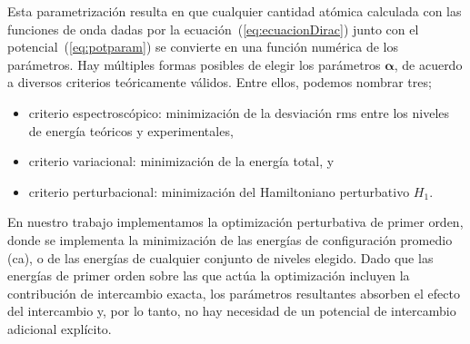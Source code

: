 Esta parametrización resulta en que cualquier cantidad atómica calculada 
con las funciones de onda dadas por la ecuación~(\ref{eq:ecuacionDirac}) 
junto con el potencial~(\ref{eq:potparam}) se convierte en una función 
numérica de los parámetros. Hay múltiples formas posibles de elegir los 
parámetros $\boldsymbol{\alpha}$, de acuerdo a diversos criterios 
teóricamente válidos. Entre ellos, podemos nombrar tres;
\begin{itemize}
\item criterio espectroscópico: minimización de la desviación \acs{rms} 
entre los niveles de energía teóricos y experimentales,
\item criterio variacional: minimización de la energía total, y
\item criterio perturbacional: minimización del Hamiltoniano perturbativo
$H_1$. %
\end{itemize}
En nuestro trabajo implementamos la optimización perturbativa de primer 
orden, donde se implementa la minimización de las energías de 
configuración promedio (\acs{ca}), o de las energías de cualquier 
conjunto de niveles elegido. Dado que las energías de primer orden 
sobre las que actúa la optimización incluyen la contribución de 
intercambio exacta, los parámetros resultantes absorben el efecto del 
intercambio y, por lo tanto, no hay necesidad de un potencial de 
intercambio adicional explícito.

